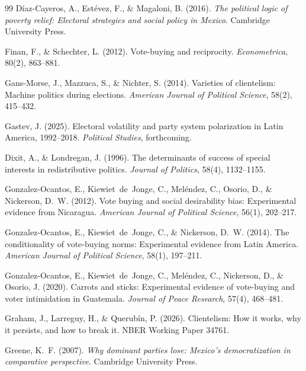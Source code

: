 \documentclass[12pt,letterpaper]{article}
\begin{document}
\begin{thebibliography}{99}
D\'{i}az-Cayeros, A., Est\'{e}vez, F., \& Magaloni, B. (2016). \textit{The political logic of poverty relief: Electoral strategies and social policy in Mexico}. Cambridge University Press.

Finan, F., \& Schechter, L. (2012). Vote-buying and reciprocity. \textit{Econometrica}, 80(2), 863--881.

Gans-Morse, J., Mazzuca, S., \& Nichter, S. (2014). Varieties of clientelism: Machine politics during elections. \textit{American Journal of Political Science}, 58(2), 415--432.

Gastev, J. (2025). Electoral volatility and party system polarization in Latin America, 1992--2018. \textit{Political Studies}, forthcoming.

Dixit, A., \& Londregan, J. (1996). The determinants of success of special interests in redistributive politics. \textit{Journal of Politics}, 58(4), 1132--1155.

Gonzalez-Ocantos, E., Kiewiet~de~Jonge, C., Mel\'{e}ndez, C., Osorio, D., \& Nickerson, D.~W. (2012). Vote buying and social desirability bias: Experimental evidence from Nicaragua. \textit{American Journal of Political Science}, 56(1), 202--217.

Gonzalez-Ocantos, E., Kiewiet~de~Jonge, C., \& Nickerson, D.~W. (2014). The conditionality of vote-buying norms: Experimental evidence from Latin America. \textit{American Journal of Political Science}, 58(1), 197--211.

Gonzalez-Ocantos, E., Kiewiet~de~Jonge, C., Mel\'{e}ndez, C., Nickerson, D., \& Osorio, J. (2020). Carrots and sticks: Experimental evidence of vote-buying and voter intimidation in Guatemala. \textit{Journal of Peace Research}, 57(4), 468--481.

Graham, J., Larreguy, H., \& Querub\'{i}n, P. (2026). Clientelism: How it works, why it persists, and how to break it. NBER Working Paper 34761.

Greene, K.~F. (2007). \textit{Why dominant parties lose: Mexico's democratization in comparative perspective}. Cambridge University Press.


\end{thebibliography}
\end{document}

